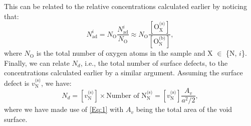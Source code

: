 \documentclass[preprint,12pt,sort&compress]{elsarticle}
\newcommand{\?}{\stackrel{?}{=}}
\begin{document}
This can be related to the relative concentrations calculated earlier by noticing that:
\begin{equation}
N_\text{ad}^i = N_\text{O} \frac{N_\text{ad}^i}{N_\text{O}} \approx N_\text{O} \frac{ [ \text{O}_\text{X}^{\text{(s)}} ] }{ [ \text{O}_\text{N}^{\text{(b)}} ] },   
\label{Eq:Nad}
\end{equation}
where $N_\text{O}$ is the total number of oxygen atoms in the sample and X $\in$ \{N, $i$\}. Finally, we can relate $N_d$, i.e., the total number of surface defects, to the concentrations calculated earlier by a similar argument. Assuming the surface defect is $v_\text{N}^{\text{(s)}}$, we have:
\begin{equation}
N_d = [ v_\text{N}^{\text{(s)}} ] \times \text{Number of N$_\text{N}^\text{(s)}$} = [ v_\text{N}^{\text{(s)}} ] \frac{A_v}{a^2 / 2}, 
\label{Eq:Nd}
\end{equation}
where we have made use of \cref{Eq:1} with $A_v$ being the total area of the void surface.
\end{document}
